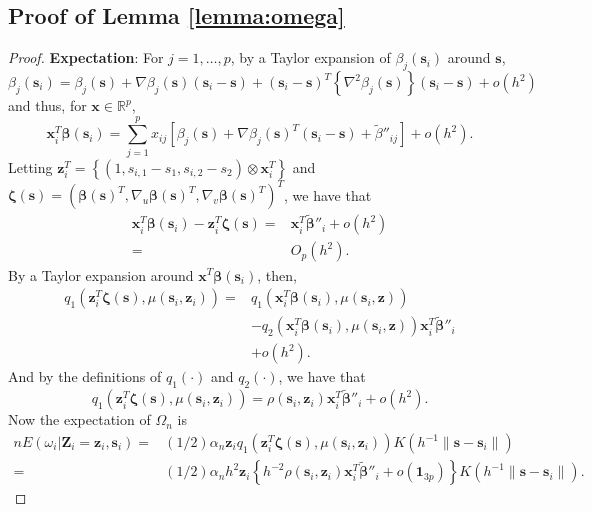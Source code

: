 \documentclass[authoryear,review, 12pt]{elsarticle}
\begin{document}
\subsection*{Proof of Lemma \ref{lemma:omega}}
\begin{proof}
\textbf{Expectation}: For $j=1,\dots,p$, by a Taylor expansion of
$\beta_{j}(\bm{s}_{i})$ around $\bm{s}$,
\[
\beta_{j}(\bm{s}_{i})=\beta_{j}(\bm{s})+\nabla\beta_{j}(\bm{s})(\bm{s}_{i}-\bm{s})+(\bm{s}_{i}-\bm{s})^{T}\left\{ \nabla^{2}\beta_{j}(\bm{s})\right\} (\bm{s}_{i}-\bm{s})+o\left(h^{2}\right)
\]
and thus, for $\bm{x}\in\mathbb{R}^{p}$, 
\[
\bm{x}_{i}^{T}\bm{\beta}\!\left(\bm{s}_{i}\right)=\sum_{j=1}^{p}x_{ij}\left[\beta_{j}(\bm{s})+\nabla\beta_{j}(\bm{s})^{T}(\bm{s}_{i}-\bm{s})+\tilde{\beta}''_{ij}\right]+o\left(h^{2}\right).
\]
Letting $\bm{z}_{i}^{T}=\left\{ \left(1,s_{i,1}-s_{1},s_{i,2}-s_{2}\right)\otimes\bm{x}_{i}^{T}\right\} $
and $\bm{\zeta}(\bm{s})=\left(\bm{\beta}(\bm{s})^{T},\nabla_{u}\bm{\beta}(\bm{s})^{T},\nabla_{v}\bm{\beta}(\bm{s})^{T}\right)^{T}$,
we have that 
\begin{align*}
\bm{x}_{i}^{T}\bm{\beta}(\bm{s}_{i})-\bm{z}_{i}^{T}\bm{\zeta}(\bm{s})= & \bm{x}_{i}^{T}\tilde{\bm{\beta}}''_{i}+o\left(h^{2}\right)\\
= & O_{p}\left(h^{2}\right).
\end{align*}
By a Taylor expansion around $\bm{x}^{T}\bm{\beta}(\bm{s}_{i})$,
then, 
\begin{align*}
q_{1}\left(\bm{z}_{i}^{T}\bm{\zeta}(\bm{s}),\mu(\bm{s}_{i},\bm{z}_{i})\right)= & q_{1}\left(\bm{x}_{i}^{T}\bm{\beta}(\bm{s}_{i}),\mu(\bm{s}_{i},\bm{z})\right)\\
 & -q_{2}\left(\bm{x}_{i}^{T}\bm{\beta}(\bm{s}_{i}),\mu(\bm{s}_{i},\bm{z})\right)\bm{x}_{i}^{T}\tilde{\bm{\beta}}''_{i}\\
 & +o\left(h^{2}\right).
\end{align*}
And by the definitions of $q_{1}(\cdot)$ and $q_{2}(\cdot)$, we
have that
\[
q_{1}\left(\bm{z}_{i}^{T}\bm{\zeta}(\bm{s}),\mu(\bm{s}_{i},\bm{z}_{i})\right)=\rho(\bm{s}_{i},\bm{z}_{i})\bm{x}_{i}^{T}\tilde{\bm{\beta}}''_{i}+o\left(h^{2}\right).
\]
Now the expectation of $\Omega_{n}$ is 
\begin{align*}
nE\left(\omega_{i}|\bm{Z}_{i}=\bm{z}_{i},\bm{s}_{i}\right)= & \left(1/2\right)\alpha_{n}\bm{z}_{i}q_{1}\left(\bm{z}_{i}^{T}\bm{\zeta}(\bm{s}),\mu(\bm{s}_{i},\bm{z}_{i})\right)K\left(h^{-1}\|\bm{s}-\bm{s}_{i}\|\right)\\
= & \left(1/2\right)\alpha_{n}h^{2}\bm{z}_{i}\left\{ h^{-2}\rho(\bm{s}_{i},\bm{z}_{i})\bm{x}_{i}^{T}\tilde{\bm{\beta}}''_{i}+o\left(\bm{1}_{3p}\right)\right\} K\left(h^{-1}\|\bm{s}-\bm{s}_{i}\|\right).

\end{align*}
\end{proof}
\end{document}

